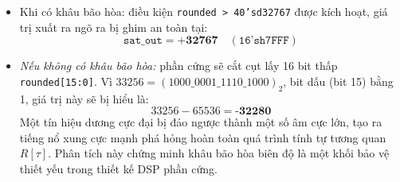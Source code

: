 \begin{enumerate}[label=(\alph*)]
    \begin{itemize}
        \item Khi có khâu bão hòa: điều kiện \texttt{rounded > 40'sd32767} được kích hoạt, giá trị xuất ra ngõ ra bị ghim an toàn tại:
        \begin{equation}
        \texttt{sat\_out} = \textbf{+32767} \quad (\texttt{16'sh7FFF})
        \end{equation}
        \item \emph{Nếu không có khâu bão hòa:} phần cứng sẽ cắt cụt lấy 16 bit thấp \texttt{rounded[15:0]}. Vì $33256 = (1000\_0001\_1110\_1000)_2$, bit dấu (bit 15) bằng 1, giá trị này sẽ bị hiểu là:
        \begin{equation}
        33256 - 65536 = \textbf{-32280}
        \end{equation}
        Một tín hiệu dương cực đại bị đảo ngược thành một số âm cực lớn, tạo ra tiếng nổ xung cực mạnh phá hỏng hoàn toàn quá trình tính tự tương quan $R[\tau]$. Phân tích này chứng minh khâu bão hòa biên độ là một khối bảo vệ thiết yếu trong thiết kế DSP phần cứng.
    \end{itemize}
\end{enumerate}




